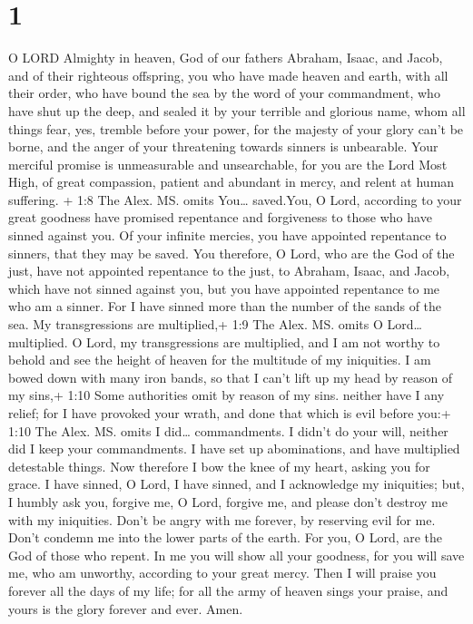 \hypertarget{section}{%
\section{1}\label{section}}

 O LORD Almighty in heaven, God of our fathers Abraham,
Isaac, and Jacob, and of their righteous offspring,  you who
have made heaven and earth, with all their order,  who have
bound the sea by the word of your commandment, who have shut up the
deep, and sealed it by your terrible and glorious name, 
whom all things fear, yes, tremble before your power,  for
the majesty of your glory can't be borne, and the anger of your
threatening towards sinners is unbearable.  Your merciful
promise is unmeasurable and unsearchable,  for you are the
Lord Most High, of great compassion, patient and abundant in mercy, and
relent at human suffering.  + 1:8 The Alex. MS. omits
You\ldots{} saved.You, O Lord, according to your great goodness have
promised repentance and forgiveness to those who have sinned against
you. Of your infinite mercies, you have appointed repentance to sinners,
that they may be saved. You therefore, O Lord, who are the God of the
just, have not appointed repentance to the just, to Abraham, Isaac, and
Jacob, which have not sinned against you, but you have appointed
repentance to me who am a sinner.  For I have sinned more
than the number of the sands of the sea. My transgressions are
multiplied,+ 1:9 The Alex. MS. omits O Lord\ldots{} multiplied. O Lord,
my transgressions are multiplied, and I am not worthy to behold and see
the height of heaven for the multitude of my iniquities.  I
am bowed down with many iron bands, so that I can't lift up my head by
reason of my sins,+ 1:10 Some authorities omit by reason of my sins.
neither have I any relief; for I have provoked your wrath, and done that
which is evil before you:+ 1:10 The Alex. MS. omits I did\ldots{}
commandments. I didn't do your will, neither did I keep your
commandments. I have set up abominations, and have multiplied detestable
things.  Now therefore I bow the knee of my heart, asking
you for grace.  I have sinned, O Lord, I have sinned, and I
acknowledge my iniquities;  but, I humbly ask you, forgive
me, O Lord, forgive me, and please don't destroy me with my iniquities.
Don't be angry with me forever, by reserving evil for me. Don't condemn
me into the lower parts of the earth. For you, O Lord, are the God of
those who repent.  In me you will show all your goodness,
for you will save me, who am unworthy, according to your great mercy.
 Then I will praise you forever all the days of my life;
for all the army of heaven sings your praise, and yours is the glory
forever and ever. Amen.
